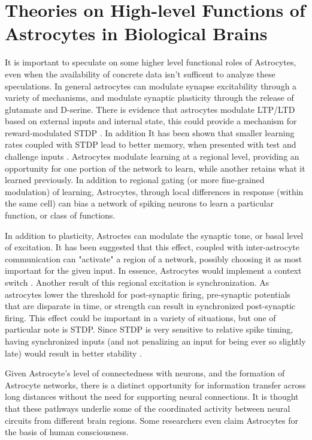     
    \section{Theories on High-level Functions of Astrocytes in Biological
      Brains}
    
    It is important to speculate on some higher level functional roles of
    Astrocytes, even when the availability of concrete data isn't sufficent to
    analyze these speculations. In general astrocytes can modulate synapse
    excitability through a variety of mechanisms, and modulate synaptic
    plasticity through the release of glutamate and D-serine. There is evidence
    that astrocytes modulate LTP/LTD based on external inputs and internal
    state, this could provide a mechanism for reward-modulated STDP
    \cite{min_2012}. In addition It has been shown that smaller learning rates
    coupled with STDP lead to better memory, when presented with test and
    challenge inputs  \cite{van-rossum_2012}. Astrocytes modulate learning at a regional level,
    providing an opportunity for one portion of the network to learn, while
    another retains what it learned previously. In addition to regional gating
    (or more fine-grained modulation) of learning, Astrocytes, through local
    differences in response (within the same cell) can bias a network of spiking
    neurons to learn a particular function, or class of functions.

    In addition to plasticity, Astroctes can modulate the synaptic tone, or
    basal level of excitation. It has been suggested that this effect, coupled
    with inter-astrocyte communication can "activate" a region of a network,
    possibly choosing it as most important for the given input. In essence,
    Astrocytes would implement a context switch \cite{min_2012}. Another
    result of this regional excitation is synchronization. As astrocytes lower
    the threshold for post-synaptic firing, pre-synaptic potentials that are
    disparate in time, or strength can result in synchronized post-synaptic
    firing. This effect could be important in a variety of situations, but one
    of particular note is STDP. Since STDP is very sensitive to relative spike
    timing, having synchronized inputs (and not penalizing an input for being
    ever so slightly late) would result in better stability .

    Given Astrocyte's level of connectedness with neurons, and the formation of
    Astrocyte networks, there is a distinct opportunity for information transfer
    across long distances without the need for supporting neural
    connections. It is thought that these pathways underlie some of the
    coordinated activity between neural circuits from different brain
    regions. Some researchers even claim Astrocytes for the basis of human
    consciousness.
